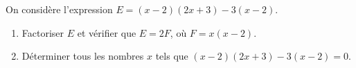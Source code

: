 
On considère l'expression $E=(x-2)(2x+3)-3(x-2)$.

\begin{enumerate}
\item Factoriser $E$ et vérifier que $E = 2F$, où $F = x(x-2)$.
\item Déterminer tous les nombres $x$ tels que $(x - 2)(2x + 3) - 3(x - 2) = 0$.
\end{enumerate}